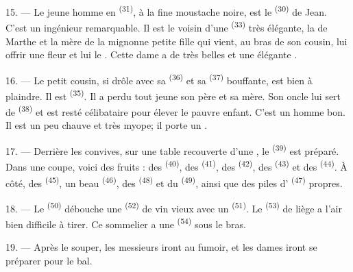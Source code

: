 15. --- Le jeune homme en  \textsuperscript{(31)}, à la fine
moustache noire, est le  \textsuperscript{(30)} de Jean.
C'est un ingénieur remarquable. Il est le voisin d'une 
\textsuperscript{(33)} très élégante, la  de Marthe et la
mère de la mignonne petite fille qui vient, au bras de son cousin, lui offrir
une fleur et lui  le . Cette dame a de très
belles  et une élégante .

16. --- Le petit cousin, si drôle avec sa  \textsuperscript{(36)}
et sa  \textsuperscript{(37)} bouffante, est bien à plaindre.
Il est  \textsuperscript{(35)}. Il a perdu tout jeune son père
et sa mère. Son oncle lui sert de  \textsuperscript{(38)} et est
resté célibataire pour élever le pauvre enfant. C'est un homme bon. Il est un
peu chauve et très myope; il porte un .

\VUsaut{2.4mm}
\VUsaut{3.0mm}

17. --- Derrière les convives, sur une table recouverte d'une ,
le  \textsuperscript{(39)} est préparé. Dans une coupe, voici
des fruits : des  \textsuperscript{(40)}, des 
\textsuperscript{(41)}, des  \textsuperscript{(42)}, des
 \textsuperscript{(43)} et des 
\textsuperscript{(44)}. À côté, des  \textsuperscript{(45)}, un
beau  \textsuperscript{(46)}, des 
\textsuperscript{(48)} et du  \textsuperscript{(49)}, ainsi
que des piles d' \textsuperscript{(47)} propres.

18. --- Le  \textsuperscript{(50)} débouche une
 \textsuperscript{(52)} de vin vieux avec un
 \textsuperscript{(51)}. Le 
\textsuperscript{(53)} de liège a l'air bien difficile à tirer. Ce sommelier a
une  \textsuperscript{(54)} sous le bras.

19. --- Après le souper, les messieurs iront au fumoir, et les dames iront se
préparer pour le bal.

\VUsaut{5.0mm}
\VUsaut{1.6mm}
\VUsaut{2.6mm}

